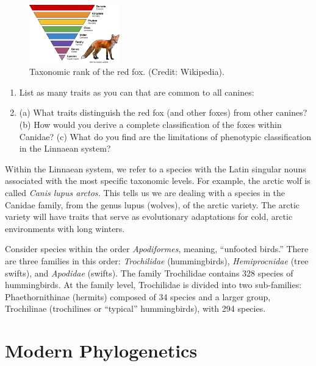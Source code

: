 \documentclass[12pt]{article}
\begin{document}
\begin{figure}[hb]
\centering
\includegraphics[width=0.35\textwidth]{figures/fox.png}
\caption{\label{fig:1} Taxonomic rank of the red fox.  (Credit: Wikipedia).}
\end{figure}

\vspace{1cm}

\begin{enumerate}
\item List as many traits as you can that are common to all canines: \\ \vspace{2cm}
\item (a) What traits distinguish the red fox (and other foxes) from other canines?  (b) How would you derive a complete classification of the foxes within Canidae? (c) What do you find are the limitations of phenotypic classification in the Linnaean system? \\ \vspace{2cm}
\end{enumerate}

Within the Linnaean system, we refer to a species with the Latin singular nouns associated with the most specific taxonomic levels.  For example, the arctic wolf is called \textit{Canis lupus arctos.}  This tells us we are dealing with a species in the Canidae family, from the genus lupus (wolves), of the arctic variety.  The arctic variety will have traits that serve as evolutionary adaptations for cold, arctic environments with long winters.

Consider species within the order \textit{Apodiformes}, meaning, ``unfooted birds.''  There are three families in this order: \textit{Trochilidae} (hummingbirds), \textit{Hemiprocnidae} (tree swifts), and \textit{Apodidae} (swifts). The family Trochilidae contains 328 species of hummingbirds. At the family level, Trochilidae is divided into two sub-families: Phaethornithinae (hermits) composed of 34 species and a larger group, Trochilinae (trochilines or ``typical'' hummingbirds), with 294 species.

\section{Modern Phylogenetics}
\end{document}
